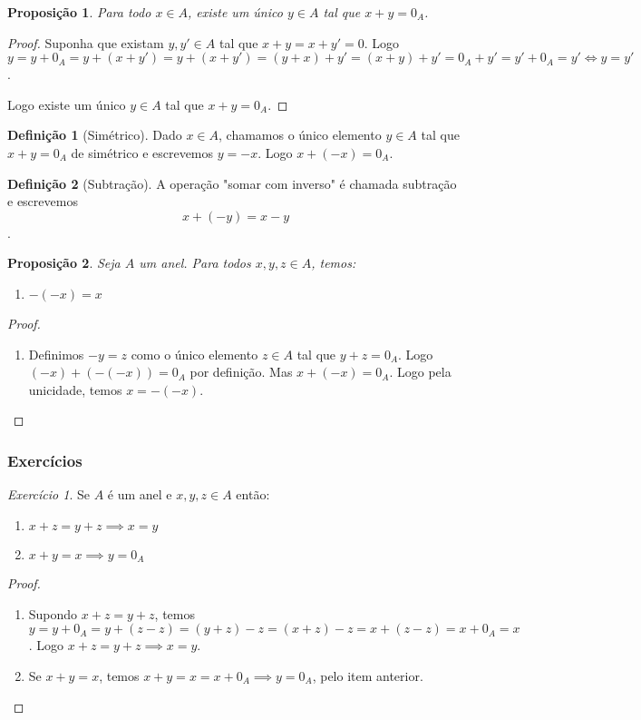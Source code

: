 \documentclass{article}
\theoremstyle{plain}
\newtheorem{prop}{Proposição}[section]
\theoremstyle{definition}
\newtheorem{definicao}{Definição}[section]
\theoremstyle{remark}
\newtheorem{exercicio}{Exercício}[subsection]
\begin{document}
\begin{prop}
	Para todo $x\in A$, existe um único $y \in A$ tal que $x+y = 0_A$.
\end{prop}
\begin{proof}
	Suponha que existam $y,y' \in A$ tal que $x + y = x+y' = 0$. Logo $y = y+0_A = y+(x+y') = y+(x+y') = (y+x) +y' = (x+y)+y' = 0_A +y' = y'+0_A = y' \iff y = y'$.

	Logo existe um único $y\in A$ tal que $x+y = 0_A$.
\end{proof}
\begin{definicao}[Simétrico]
	Dado $x\in A$, chamamos o único elemento $y\in A$ tal que $x+y = 0_A$ de simétrico e escrevemos $y = -x$. Logo $x+(-x) = 0_A$.
\end{definicao}
\begin{definicao}[Subtração]
	A operação "somar com inverso" é chamada subtração e escrevemos $$x+(-y) = x-y$$.
\end{definicao}
\begin{prop}
	Seja $A$  um anel. Para todos $x,y,z \in A$, temos:
	\begin{enumerate}[label=(\alph*)]
		\item $-(-x) = x$
	\end{enumerate}
\end{prop}
\begin{proof}
	~\\
	
	\begin{enumerate}[label=(\alph*)]
		\item Definimos $-y = z$ como o único elemento $z\in A$ tal que $y + z = 0_A $.   Logo $(-x) +(-(-x)) =   0_A$ por definição. Mas $x + (-x) = 0_A$. Logo pela unicidade, temos $x =-(-x)$.
	\end{enumerate}
\end{proof}
\subsubsection{Exercícios}
\begin{exercicio}
	Se $A$ é um anel e $x,y,z\in A$ então:
	\begin{enumerate}[label = (\alph*)]
		\item $ x+z = y+z \implies x  =y $
		\item $x+y = x \implies y = 0_A$
	\end{enumerate}
\end{exercicio}
\begin{proof}
 ~\\
	\begin{enumerate}[label = (\alph*)]
		\item Supondo $x+z = y+z$,  temos  $ y = y +0_A = y + (z-z) = (y+z) -z = (x+z) - z = x+(z-z) = x+0_A = x$. Logo $ x+z = y+z \implies x  =y $.
		\item Se $x+y = x$, temos $x+y = x = x+0_A \implies y = 0_A$, pelo item anterior.
	\end{enumerate}

\end{proof}
\end{document}
